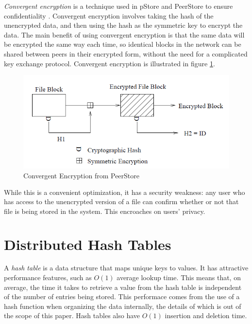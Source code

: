 \documentclass[12pt]{report}
\begin{document}
\textit{Convergent encryption} is a technique used in pStore and PeerStore to ensure confidentiality \cite{pStore, PeerStore}. Convergent encryption involves taking the hash of the unencrypted data, and then using the hash as the symmetric key to encrypt the data. The main benefit of using convergent encryption is that the same data will be encrypted the same way each time, so identical blocks in the network can be shared between peers in their encrypted form, without the need for a complicated key exchange protocol. Convergent encryption is illustrated in figure \ref{fig:convergent}.

\begin{figure} \label{fig:convergent}
  \centering
  \includegraphics[scale=0.75]{ConvergentEncryption}
  \caption{Convergent Encryption from PeerStore}
\end{figure}

While this is a convenient optimization, it has a security weakness: any user who has access to the unencrypted version of a file can confirm whether or not that file is being stored in the system. This encroaches on users' privacy.


\section{Distributed Hash Tables} \label{sec:backgroundDHT}

A \textit{hash table} is a data structure that maps unique keys to values. It has attractive performance features, such as $O(1)$ average lookup time. This means that, on average, the time it takes to retrieve a value from the hash table is independent of the number of entries being stored. This performace comes from the use of a hash function when organizing the data internally, the details of which is out of the scope of this paper. Hash tables also have $O(1)$ insertion and deletion time.
\end{document}
